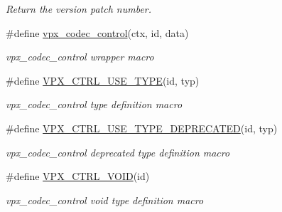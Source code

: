 \begin{DoxyCompactItemize}
\begin{DoxyCompactList}\small\item\em Return the version patch number. \end{DoxyCompactList}\item 
\#define \hyperlink{group__codec_gac1b91e04698c1bd4c0a2b8aa85b08cd2}{vpx\+\_\+codec\+\_\+control}(ctx,  id,  data)
\begin{DoxyCompactList}\small\item\em vpx\+\_\+codec\+\_\+control wrapper macro \end{DoxyCompactList}\item 
\#define \hyperlink{group__codec_gaa7409a4cb58b155912f41a4d39d81a8a}{V\+P\+X\+\_\+\+C\+T\+R\+L\+\_\+\+U\+S\+E\+\_\+\+T\+Y\+PE}(id,  typ)
\begin{DoxyCompactList}\small\item\em vpx\+\_\+codec\+\_\+control type definition macro \end{DoxyCompactList}\item 
\#define \hyperlink{group__codec_ga147463efbdbe3b9823e054fe2d56851b}{V\+P\+X\+\_\+\+C\+T\+R\+L\+\_\+\+U\+S\+E\+\_\+\+T\+Y\+P\+E\+\_\+\+D\+E\+P\+R\+E\+C\+A\+T\+ED}(id,  typ)
\begin{DoxyCompactList}\small\item\em vpx\+\_\+codec\+\_\+control deprecated type definition macro \end{DoxyCompactList}\item 
\#define \hyperlink{group__codec_ga2610354d13efd9ca04fb95823aeda773}{V\+P\+X\+\_\+\+C\+T\+R\+L\+\_\+\+V\+O\+ID}(id)
\begin{DoxyCompactList}\small\item\em vpx\+\_\+codec\+\_\+control void type definition macro \end{DoxyCompactList}\end{DoxyCompactItemize}
